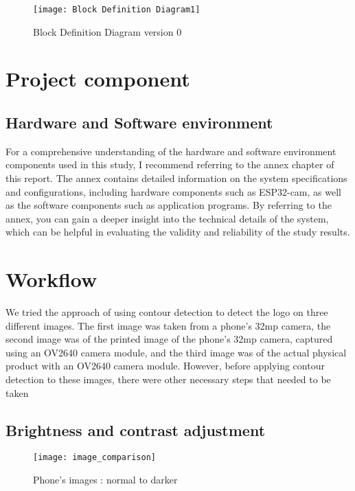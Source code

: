 \FloatBarrier
\FloatBarrier
\begin{figure}[h]
\FloatBarrier
         \centering
        \texttt{[image: Block Definition Diagram1]}
   
        \caption{Block Definition Diagram version 0}
        \label{Block Definition Diagram version 0}
\FloatBarrier
    \end{figure}


\FloatBarrier




\section{Project component}
\subsection{Hardware and Software environment}
For a comprehensive understanding of the hardware and software environment components used in this study, I recommend referring to the annex chapter  of this report. The annex contains detailed information on the system specifications and configurations, including hardware components such as ESP32-cam, as well as the software components such as  application programs. By referring to the annex, you can gain a deeper insight into the technical details of the system, which can be helpful in evaluating the validity and reliability of the study results.


\section{Workflow}
We tried the approach of using contour detection to detect the logo on three different images. The first image was taken from a phone's 32mp camera, the second image was of the printed image of the phone's 32mp camera, captured using an OV2640 camera module, and the third image was of the actual physical product with an OV2640 camera module. However, before applying contour detection to these images, there were other necessary steps that needed to be taken
\subsection{Brightness and contrast adjustment}

\FloatBarrier
\begin{figure}[h]
\FloatBarrier
         \centering
        \texttt{[image: image\_comparison]}
   
        \caption{Phone's images : normal to darker}
        \label{fig:Phone's images : normal to darker}
\FloatBarrier
    \end{figure}


